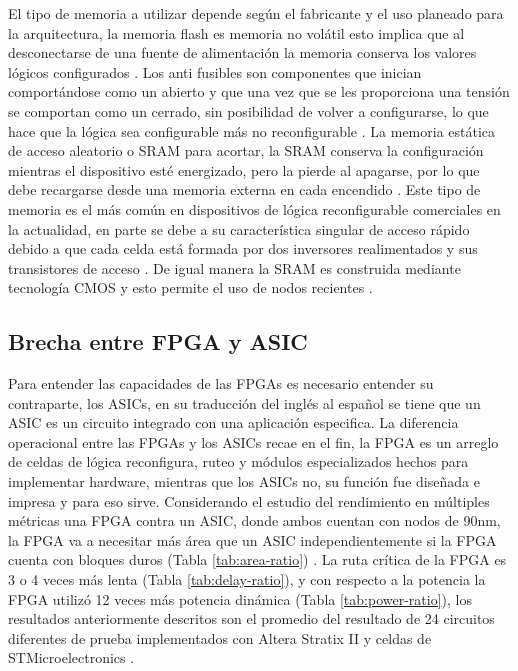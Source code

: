 El tipo de memoria a utilizar depende según el fabricante y el uso planeado para la arquitectura, la memoria flash es memoria no volátil esto implica que al desconectarse de una fuente de alimentación la memoria conserva los valores lógicos configurados \cite{B_gaillardon2011, C_allelcoelec2026}. Los anti fusibles son componentes que inician comportándose como un abierto y que una vez que se les proporciona una tensión se comportan como un cerrado, sin posibilidad de volver a configurarse, lo que hace que la lógica sea configurable más no reconfigurable \cite{B_gaillardon2011, C_allelcoelec2026}. La memoria estática de acceso aleatorio o SRAM para acortar, la SRAM conserva la configuración mientras el dispositivo esté energizado, pero la pierde al apagarse, por lo que debe recargarse desde una memoria externa en cada encendido \cite{kuon2008fpga}. Este tipo de memoria es el más común en dispositivos de lógica reconfigurable comerciales en la actualidad, en parte se debe a su característica singular de acceso rápido debido a que cada celda está formada por dos inversores realimentados y sus transistores de acceso \cite{B_gaillardon2011, C_allelcoelec2026, D_schneider2026}. De igual manera la SRAM es construida mediante tecnología CMOS y esto permite el uso de nodos recientes \cite{kuon2008fpga}.

\subsection{Brecha entre FPGA y ASIC}
Para entender las capacidades de las FPGAs es necesario entender su contraparte, los ASICs, en su traducción del inglés al español se tiene que un ASIC es un circuito integrado con una aplicación especifica. La diferencia operacional entre las FPGAs y los ASICs recae en el fin, la FPGA es un arreglo de celdas de lógica reconfigura, ruteo y módulos especializados hechos para implementar hardware, mientras que los ASICs no, su función fue diseñada e impresa y para eso sirve. Considerando el estudio del rendimiento en múltiples métricas una FPGA contra un ASIC, donde ambos cuentan con nodos de 90nm, la FPGA va a necesitar más área que un ASIC independientemente si la FPGA cuenta con bloques duros (Tabla \ref{tab:area-ratio}) \cite{E_kuon2007}. La ruta crítica de la FPGA es 3 o 4 veces más lenta (Tabla \ref{tab:delay-ratio}), y con respecto a la potencia la FPGA utilizó 12 veces más potencia dinámica (Tabla \ref{tab:power-ratio}), los resultados anteriormente descritos son el promedio del resultado de 24 circuitos diferentes de prueba implementados con Altera Stratix II y celdas de STMicroelectronics \cite{E_kuon2007}.


